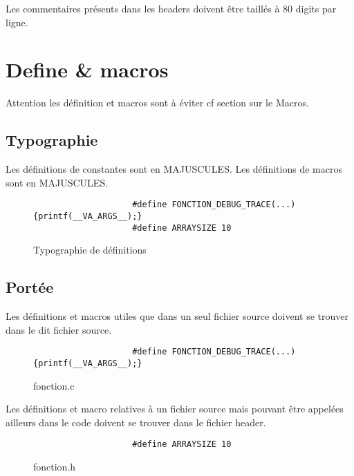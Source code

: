 			Les commentaires présents dans les headers doivent être taillés à 80 digits par ligne.
		
	\section{Define \& macros}
		Attention les définition et macros sont à éviter cf section sur le Macros.

		\subsection{Typographie}
			Les définitions de constantes sont en MAJUSCULES. Les définitions de macros sont en MAJUSCULES.

			\begin{figure}[H]
				\begin{changemargin}{-2.5cm}{-2.5cm}
				\begin{tcolorbox}
				\begin{verbatim}
					#define FONCTION_DEBUG_TRACE(...) {printf(__VA_ARGS__);}
					#define ARRAYSIZE 10
				\end{verbatim}
				\end{tcolorbox}
				\end{changemargin}
				\caption{Typographie de définitions}
			\end{figure}

		\subsection{Portée}
			Les définitions et macros utiles que dans un seul fichier source doivent se trouver dans le dit fichier source.

			\begin{figure}[H]
				\begin{changemargin}{-2.5cm}{-2.5cm}
				\begin{tcolorbox}
				\begin{verbatim}
					#define FONCTION_DEBUG_TRACE(...) {printf(__VA_ARGS__);}
				\end{verbatim}
				\end{tcolorbox}
				\end{changemargin}
				\caption{fonction.c}
			\end{figure}

			Les définitions et macro relatives à un fichier source mais pouvant être appelées ailleurs dans le code doivent se trouver dans le fichier header.

			\begin{figure}[H]
				\begin{changemargin}{-2.5cm}{-2.5cm}
				\begin{tcolorbox}
				\begin{verbatim}
					#define ARRAYSIZE 10
				\end{verbatim}
				\end{tcolorbox}
				\end{changemargin}
				\caption{fonction.h}
			\end{figure}

